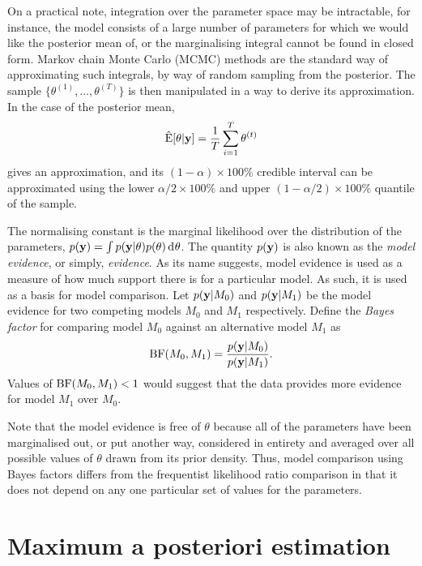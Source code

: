 On a practical note, integration over the parameter space may be intractable, for instance, the model consists of a large number of parameters for which we would like the posterior mean of, or the marginalising integral cannot be found in closed form.
Markov chain Monte Carlo (MCMC) methods are the standard way of approximating such integrals, by way of random sampling from the posterior.
The sample $\{\theta^{(1)},\dots,\theta^{(T)} \}$ is then manipulated in a way to derive its approximation.
In the case of the posterior mean,
\begin{equation}
  \hat{\operatorname{E}}[\theta|{\mathbf y}] = \frac{1}{T}\sum_{i=1}^T \theta^{(t)}
\end{equation}
gives an approximation, and its $(1-\alpha) \times 100\%$ credible interval can be approximated using the lower $\alpha/2\times 100\%$ and upper $(1-\alpha/2)\times 100\%$ quantile of the sample.

The normalising constant is the marginal likelihood over the distribution of the parameters, $p({\mathbf y}) = \int p({\mathbf y}|\theta) p(\theta) \operatorname{d}\hspace{0.5pt}\! \theta$.
The quantity $p({\mathbf y})$ is also known as the \emph{model evidence}, or simply, \emph{evidence}.
As its name suggests, model evidence is used as a measure of how much support there is for a particular model.
As such, it is used as a basis for model comparison.
Let $p({\mathbf y}|M_0)$ and $p({\mathbf y}|M_1)$ be the model evidence for two competing models $M_0$ and $M_1$ respectively.
Define the \emph{Bayes factor} for comparing model $M_0$ against an alternative model $M_1$ as
\begin{equation}
  \operatorname{BF}(M_0,M_1) = \frac{p({\mathbf y}|M_0)}{p({\mathbf y}|M_1)}.
\end{equation}
Values of $\operatorname{BF}(M_0,M_1) < 1$ would suggest that the data provides more evidence for model $M_1$ over $M_0$.

Note that the model evidence is free of $\theta$ because all of the parameters have been marginalised out, or put another way, considered in entirety and averaged over all possible values of $\theta$ drawn from its prior density.
Thus, model comparison using Bayes factors differs from the frequentist likelihood ratio comparison in that it does not depend on any one particular set of values for the parameters.

\section{Maximum a posteriori estimation}

